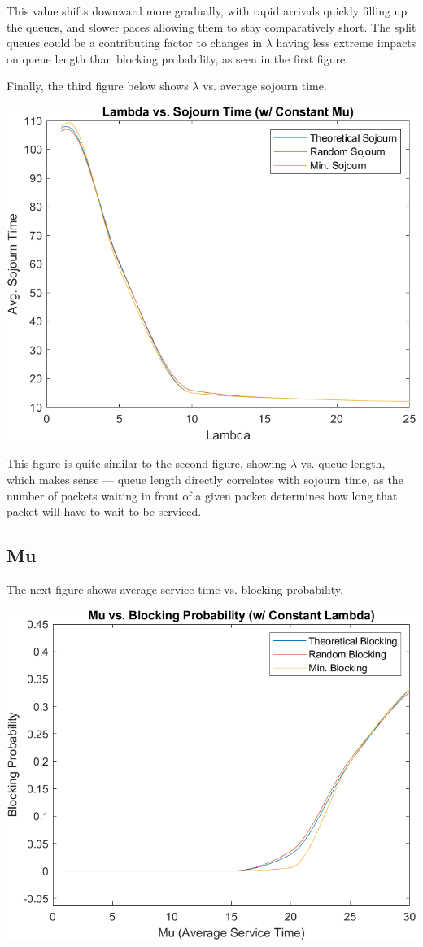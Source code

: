 \documentclass[11pt]{article} %
\begin{document}
This value shifts downward more gradually, with rapid arrivals quickly filling up the queues, and slower paces allowing them to stay comparatively short. The split queues could be a contributing factor to changes in $\lambda$ having less extreme impacts on queue length than blocking probability, as seen in the first figure.

Finally, the third figure below shows $\lambda$ vs. average sojourn time.

\begin{center}
\includegraphics[width=.875\textwidth]{3}
\end{center}

This figure is quite similar to the second figure, showing $\lambda$ vs. queue length, which makes sense — queue length directly correlates with sojourn time, as the number of packets waiting in front of a given packet determines how long that packet will have to wait to be serviced.

\subsection{Mu}

The next figure shows average service time vs. blocking probability.

\begin{center}
\includegraphics[width=.875\textwidth]{4}
\end{center}
\end{document}
